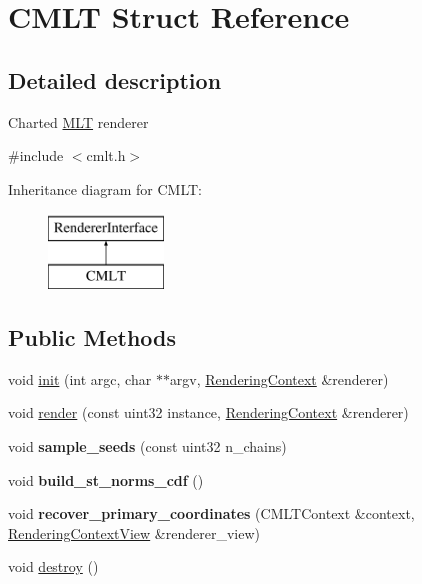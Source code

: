 \hypertarget{struct_c_m_l_t}{}\section{C\+M\+LT Struct Reference}
\label{struct_c_m_l_t}


\subsection{Detailed description}
Charted \hyperlink{struct_m_l_t}{M\+LT} renderer 

{\ttfamily \#include $<$cmlt.\+h$>$}

Inheritance diagram for C\+M\+LT\+:\begin{figure}[H]
\begin{center}
\leavevmode
\includegraphics[height=2.000000cm]{struct_c_m_l_t}
\end{center}
\end{figure}
\subsection*{Public Methods}
\begin{DoxyCompactItemize}
\item 
void \hyperlink{struct_c_m_l_t_a16f9c8c63c6027478854528963cf4ccf}{init} (int argc, char $\ast$$\ast$argv, \hyperlink{struct_rendering_context}{Rendering\+Context} \&renderer)
\item 
void \hyperlink{struct_c_m_l_t_ad8fe8b00cbe99184c726849da14a5ab2}{render} (const uint32 instance, \hyperlink{struct_rendering_context}{Rendering\+Context} \&renderer)
\item 
\mbox{\label{struct_c_m_l_t_ac6543dff92a861254148e223b0117741}} 
void {\bfseries sample\+\_\+seeds} (const uint32 n\+\_\+chains)
\item 
\mbox{\label{struct_c_m_l_t_a72fd786f4cb773e69b0e5586236abf32}} 
void {\bfseries build\+\_\+st\+\_\+norms\+\_\+cdf} ()
\item 
\mbox{\label{struct_c_m_l_t_a5740b19950843683b9c4ed03493badcf}} 
void {\bfseries recover\+\_\+primary\+\_\+coordinates} (C\+M\+L\+T\+Context \&context, \hyperlink{struct_rendering_context_view}{Rendering\+Context\+View} \&renderer\+\_\+view)
\item 
void \hyperlink{struct_c_m_l_t_aa8558dad2db5508be7aa028f69af7308}{destroy} ()
\end{DoxyCompactItemize}
